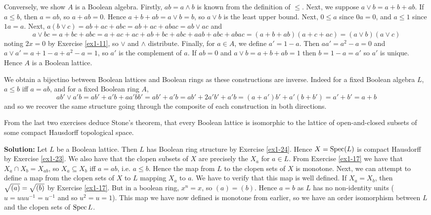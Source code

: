 \documentclass{article}
\begin{document}
Conversely, we show \(A\) is a Boolean algebra.
Firstly, \(ab = a \land b\) is known from the definition of \(\leq\).
Next, we suppose \(a \lor b = a + b + ab\).
If \(a \leq b\), then \(a = ab\), so \(a + ab = 0\).
Hence \(a + b + ab = a \lor b = b\), so \(a \lor b\) is the least upper bound.
Next, \(0 \leq a\) since \(0a = 0\), and \(a \leq 1\) since \(1a = a\).
Next, \(a (b \lor c) = ab + ac + abc = ab + ac + abac = ab \lor ac\) and
\[
    a \lor bc = a + bc + abc = a + ac + ac + ab + bc + abc + aab + abc + abac = (a + b + ab) (a + c + ac) = (a \lor b) (a \lor c)
\]
noting \(2x = 0\) by Exercise \ref{ex1-11}, so \(\lor\) and \(\land\) distribute.
Finally, for \(a \in A\), we define \(a' = 1-a\).
Then \(a a' = a^2 - a = 0\) and \(a \lor a' = a + 1 - a + a^2 - a = 1\), so \(a'\) is the complement of \(a\).
If \(ab = 0\) and \(a \lor b = a + b + ab = 1\) then \(b = 1 - a = a'\) so \(a'\) is unique.
Hence \(A\) is a Boolean lattice.

We obtain a bijectino between Boolean lattices and Boolean rings as these constructions are inverse.
Indeed for a fixed Boolean algebra \(L\), \(a \leq b\) iff \(a = ab\), and for a fixed Boolean ring \(A\),
\[
    a b' \lor a' b
    = a b' + a' b + a a' b b'
    = a b' + a' b
    = a b' + 2 a' b' + a' b
    = (a + a') b' + a' (b + b')
    = a' + b'
    = a + b
\]
and so we recover the same structure going through the composite of each construction in both directions.

\begin{exercise}
    From the last two exercises deduce Stone's theorem, that every Boolean lattice is isomorphic to the lattice of open-and-closed subsets of some compact Hausdorff topological space.
\end{exercise}

\noindent\textbf{Solution:}
Let \(L\) be a Boolean lattice.
Then \(L\) has Boolean ring structure by Exercise \ref{ex1-24}.
Hence \(X = \operatorname{Spec}(L)\) is compact Hausdorff by Exercise \ref{ex1-23}.
We also have that the clopen subsets of \(X\) are precisely the \(X_a\) for \(a \in L\).
From Exercise \ref{ex1-17} we have that \(X_a \cap X_b = X_{ab}\), so \(X_a \subseteq X_b\) iff \(a = ab\), i.e. \(a \leq b\).
Hence the map from \(L\) to the clopen sets of \(X\) is monotone.
Next, we can attempt to define a map from the clopen sets of \(X\) to \(L\) mapping \(X_a\) to \(a\).
We have to verify that this map is well defined.
If \(X_a = X_b\), then \(\sqrt{(a)} = \sqrt{(b)}\) by Exercise \ref{ex1-17}.
But in a boolean ring, \(x^n = x\), so \((a) = (b)\).
Hence \(a = b\) as \(L\) has no non-identity units (\(u = u u u^{-1} = u^{-1}\) and so \(u^2 = u = 1\)).
This map we have now defined is monotone from earlier, so we have an order isomorphism between \(L\) and the clopen sets of \(\operatorname{Spec}{L}\).
\end{document}
